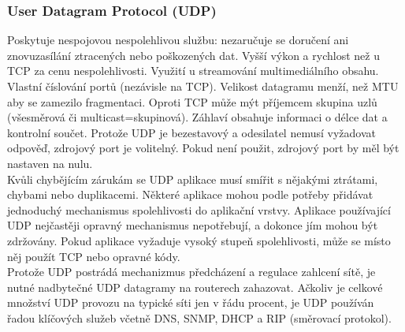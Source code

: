 \documentclass[10pt,a4paper]{article}
\begin{document}
\subsubsection{User Datagram Protocol (UDP)}
Poskytuje nespojovou nespolehlivou službu: nezaručuje se doručení ani znovuzasílání ztracených nebo poškozených dat. Vyšší výkon a rychlost než u TCP za cenu nespolehlivosti. Využití u streamování multimediálního obsahu.\\
Vlastní číslování portů (nezávisle na TCP). Velikost datagramu menží, než MTU aby se zamezilo fragmentaci. Oproti TCP může mýt příjemcem skupina uzlů (všesměrová či multicast=skupinová). Záhlaví obsahuje informaci o délce dat a kontrolní součet. Protože UDP je bezestavový a odesilatel nemusí vyžadovat odpověď, zdrojový port je volitelný. Pokud není použit, zdrojový port by měl být nastaven na nulu. \\
Kvůli chybějícím zárukám se UDP aplikace musí smířit s nějakými ztrátami, chybami nebo duplikacemi. Některé aplikace mohou podle potřeby přidávat jednoduchý mechanismus spolehlivosti do aplikační vrstvy. Aplikace používající UDP nejčastěji opravný mechanismus nepotřebují, a dokonce jím mohou být zdržovány. Pokud aplikace vyžaduje vysoký stupeň spolehlivosti, může se místo něj použít TCP nebo opravné kódy. \\
Protože UDP postrádá mechanizmus předcházení a regulace zahlcení sítě, je nutné nadbytečné UDP datagramy na routerech zahazovat. Ačkoliv je celkové množství UDP provozu na typické síti jen v řádu procent, je UDP používán řadou klíčových služeb včetně DNS, SNMP, DHCP a RIP (směrovací protokol). \\
\end{document}
